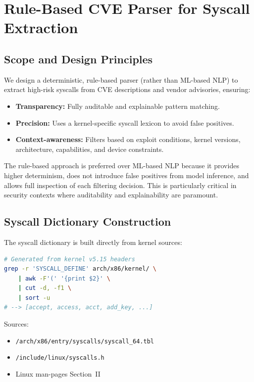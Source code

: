 \appendices
\section{Rule-Based CVE Parser for Syscall Extraction}
\label{appendix:cve_parser}

\subsection{Scope and Design Principles}
\label{subsec:appendix_scope}

We design a deterministic, rule-based parser (rather than ML-based NLP) to extract high-risk
syscalls from CVE descriptions and vendor advisories, ensuring:

\begin{itemize}
  \item \textbf{Transparency:} Fully auditable and explainable pattern matching.
  \item \textbf{Precision:} Uses a kernel-specific syscall lexicon to avoid false positives.
  \item \textbf{Context-awareness:} Filters based on exploit conditions, kernel versions,
        architecture, capabilities, and device constraints.
\end{itemize}

The rule-based approach is preferred over ML-based NLP because it provides higher determinism,
does not introduce false positives from model inference, and allows full inspection of each
filtering decision. This is particularly critical in security contexts where auditability and
explainability are paramount.

\subsection{Syscall Dictionary Construction}
\label{subsec:appendix_dictionary}

The syscall dictionary is built directly from kernel sources:

\begin{lstlisting}[float=htbp, language=bash, caption={Extracting syscall names from kernel sources.}]
# Generated from kernel v5.15 headers
grep -r 'SYSCALL_DEFINE' arch/x86/kernel/ \
    | awk -F'(' '{print $2}' \
    | cut -d, -f1 \
    | sort -u
# --> [accept, access, acct, add_key, ...]
\end{lstlisting}

Sources:
\begin{itemize}
  \item \texttt{/arch/x86/entry/syscalls/syscall\_64.tbl}
  \item \texttt{/include/linux/syscalls.h}
  \item Linux man-pages Section~II
\end{itemize}

